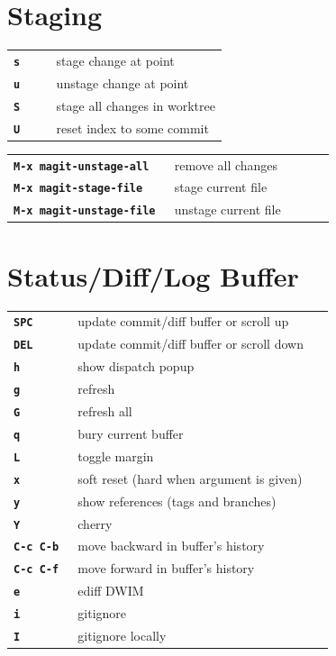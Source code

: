 \documentclass[9pt]{extarticle} %
\begin{document}
\begin{multicols}{3}

  \section*{Staging}

  \begin{tabular}{L{0.20\linewidth} L{0.80\linewidth}}
    \tt \textbf{s} & stage change at point \\
    \tt \textbf{u} & unstage change at point \\
    \tt \textbf{S} & stage all changes in worktree \\
    \tt \textbf{U} & reset index to some commit
  \end{tabular}
  \begin{tabular}{L{0.50\linewidth} L{0.50\linewidth}}
    \tt \textbf{M-x magit-unstage-all} & remove all changes \\
    \tt \textbf{M-x magit-stage-file} & stage current file \\
    \tt \textbf{M-x magit-unstage-file} & unstage current file
  \end{tabular}


  \section*{Status/Diff/Log Buffer}

  \begin{tabular}{L{0.20\linewidth} L{0.80\linewidth}}
    \tt \textbf{SPC} & update commit/diff buffer or scroll up \\
    \tt \textbf{DEL} & update commit/diff buffer or scroll down \\
    \tt \textbf{h} & show dispatch popup \\
    \tt \textbf{g} & refresh \\
    \tt \textbf{G} & refresh all \\
    \tt \textbf{q} & bury current buffer \\
    \tt \textbf{L} & toggle margin \\
    \tt \textbf{x} & soft reset (hard when argument is given) \\
    \tt \textbf{y} & show references (tags and branches) \\
    \tt \textbf{Y} & cherry \\
    \tt \textbf{C-c C-b} & move backward in buffer's history \\
    \tt \textbf{C-c C-f} & move forward in buffer's history \\
    \tt \textbf{e} & ediff DWIM \\
    \tt \textbf{i} & gitignore \\
    \tt \textbf{I} & gitignore locally
  \end{tabular}


\end{multicols}
\end{document}
